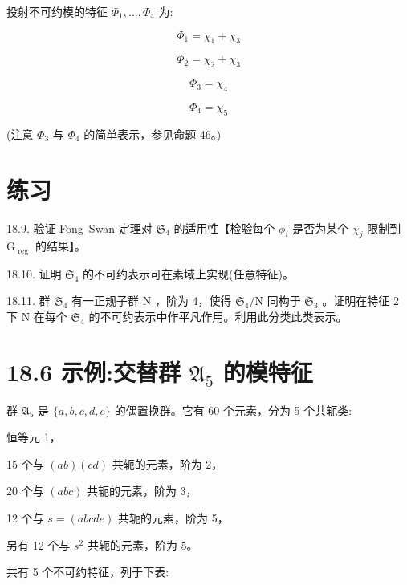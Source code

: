 \documentclass[10pt]{article}
\begin{document}
投射不可约模的特征 \({\Phi }_{1},\ldots ,{\Phi }_{4}\) 为:

\[
{\Phi }_{1} = {\chi }_{1} + {\chi }_{3}
\]

\[
{\Phi }_{2} = {\chi }_{2} + {\chi }_{3}
\]

\[
{\Phi }_{3} = {\chi }_{4}
\]

\[
{\Phi }_{4} = {\chi }_{5}
\]

(注意 \({\Phi }_{3}\) 与 \({\Phi }_{4}\) 的简单表示，参见命题 46。)

\section*{练习}

18.9. 验证 Fong–Swan 定理对 \({\mathfrak{S}}_{4}\) 的适用性【检验每个 \({\phi }_{i}\) 是否为某个 \({\chi }_{j}\) 限制到 \({\mathrm{G}}_{\text{ reg }}\) 的结果】。

18.10. 证明 \({\mathfrak{S}}_{4}\) 的不可约表示可在素域上实现(任意特征)。

18.11. 群 \({\mathfrak{S}}_{4}\) 有一正规子群 \(\mathrm{N}\) ，阶为 4，使得 \({\mathfrak{S}}_{4}/\mathrm{N}\) 同构于 \({\mathfrak{S}}_{3}\) 。证明在特征 2 下 \(\mathrm{N}\) 在每个 \({\mathfrak{S}}_{4}\) 的不可约表示中作平凡作用。利用此分类此类表示。

\section*{18.6 示例:交替群 \({\mathfrak{A}}_{5}\) 的模特征}

群 \({\mathfrak{A}}_{5}\) 是 \(\{ a,b,c,d,e\}\) 的偶置换群。它有 60 个元素，分为 5 个共轭类:

恒等元 1，

15 个与 \(\left( {ab}\right) \left( {cd}\right)\) 共轭的元素，阶为 2，

20 个与 \(\left( {abc}\right)\) 共轭的元素，阶为 3，

12 个与 \(s = \left( {abcde}\right)\) 共轭的元素，阶为 5，

另有 12 个与 \({s}^{2}\) 共轭的元素，阶为 5。

共有 5 个不可约特征，列于下表:

\begin{center}
\end{center}
\end{document}
